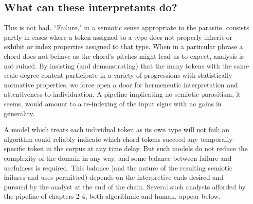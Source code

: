 \subsection{What can these interpretants do?}
This is not bad.  ``Failure," in a semiotic sense appropriate to the parasite, consists partly in cases where a token assigned to a type does not properly inherit or exhibit or index properties assigned to that type.  When in a particular phrase a chord does not behave as the chord's pitches might lead us to expect, analysis is not ruined.  By insisting (and demonstrating) that the many tokens with the same scale-degree content participate in a variety of progressions with statistically normative properties, we force open a door for hermeneutic interpretation and attentiveness to individuation.  A pipeline implicating no semiotic parasitism, it seems, would amount to a re-indexing of the input signs with no gains in generality.

A model which treats each individual token as its own type will not fail; an algorithm could reliably indicate which chord tokens succeed any temporally-specific token in the corpus at any time delay.  But such models do not reduce the complexity of the domain in any way, and some balance between failure and usefulness is required.  This balance (and the nature of the resulting semiotic failures and uses permitted) depends on the interpretive ends desired and pursued by the analyst at the end of the chain.  Several such analysts afforded by the pipeline of chapters 2-4, both algorithmic and human, appear below.

